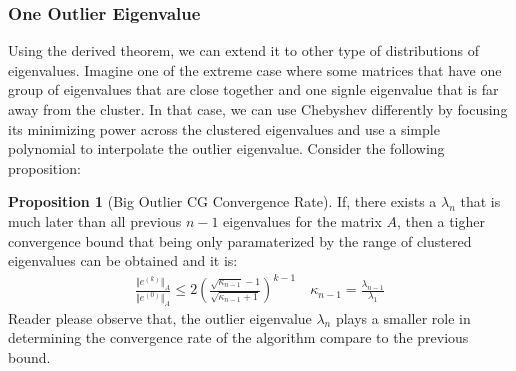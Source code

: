 \documentclass[]{article}
\theoremstyle{definition}
\newtheorem{prop}{Proposition}[section]  %
\begin{document}
        \subsubsection{One Outlier Eigenvalue}
            Using the derived theorem, we can extend it to other type of distributions of eigenvalues. Imagine one of the extreme case where some matrices that have one group of eigenvalues that are close together and one signle eigenvalue that is far away from the cluster. In that case, we can use Chebyshev differently by focusing its minimizing power across the clustered eigenvalues and use a simple polynomial to interpolate the outlier eigenvalue. Consider the following proposition: 
            \begin{prop}[Big Outlier CG Convergence Rate]
                If, there exists a $\lambda_n$ that is much later than all previous $n - 1$ eigenvalues for the matrix $A$, then a tigher convergence bound that being only paramaterized by the range of clustered eigenvalues can be obtained and it is: 
                \begin{align}
                    \frac{\Vert e^{(k)}\Vert_A}{\Vert e^{(0)}\Vert_A} \le 
                    2 \left(
                        \frac{\sqrt{\kappa_{n - 1}} - 1}{\sqrt{\kappa_{n - 1} + 1}}
                    \right)^{k - 1}\quad 
                    \kappa_{n - 1} =  \frac{\lambda_{n - 1}}{\lambda_1}
                \end{align}
                Reader please observe that, the outlier eigenvalue $\lambda_n$ plays a smaller role in determining the convergence rate of the algorithm compare to the previous bound. 
            \end{prop}
\end{document}
